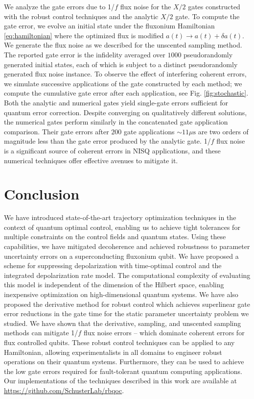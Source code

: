 \documentclass[
  amsfonts,
  amsmath,
  amssymb,
  pra,
  twocolumn,
  superscriptaddress,
]{revtex4-2}
\begin{document}
We analyze the gate errors due to 1/$f$ flux noise for
the $X/2$ gates constructed with the robust control techniques
and the analytic $X/2$ gate. To compute the gate error,
we evolve an initial state
under the fluxonium Hamiltonian \eqref{eq:hamiltonian}
where the optimized flux is modified $a(t) \rightarrow a(t) + \delta a(t)$.
We generate the flux noise as
we described for the unscented sampling method.
The reported gate error is the infidelity
averaged over $1000$ pseudorandomly generated initial states,
each of which is subject to a distinct pseudorandomly
generated flux noise instance.
To observe the effect of interfering coherent errors,
we simulate successive applications of the gate constructed by each method;
we compute the cumulative gate error
after each application, see Fig. \ref{fig:stochastic}.
Both the analytic
and numerical gates yield single-gate errors
sufficient for quantum error correction.
Despite converging on qualitatively different solutions, the
numerical gates perform similarly in the concatenated
gate application comparison. Their gate errors
after $200$ gate applications $\sim 11 \mu\textrm{s}$ are
two orders of magnitude less than the gate error produced by the analytic gate.
1/$f$ flux noise is a significant source of coherent errors in NISQ applications,
and these numerical techniques offer effective avenues to mitigate it.

\section{Conclusion}
We have introduced state-of-the-art trajectory optimization
techniques in the context of quantum optimal control, enabling
us to achieve tight tolerances for multiple constraints on the
control fields and quantum states. Using these capabilities,
we have mitigated decoherence and
achieved robustness to parameter uncertainty
errors on a superconducting fluxonium qubit.
We have proposed a scheme for suppressing
depolarization with time-optimal
control and the integrated depolarization rate model.
The computational complexity of evaluating this model is
independent of the dimension of the Hilbert space, enabling
inexpensive optimization on high-dimensional quantum systems.
We have also proposed the derivative method for robust control which achieves
superlinear gate error reductions in the gate time for the static parameter
uncertainty problem we studied.
We have shown that the derivative, sampling, and unscented sampling methods
can mitigate 1/$f$ flux noise errors -- which
dominate coherent errors for flux controlled qubits.
These robust control techniques can be applied
to any Hamiltonian,
allowing experimentalists in all domains to engineer robust
operations on their quantum systems.
Furthermore, they can be used to achieve the low gate errors
required for fault-tolerant quantum computing applications. Our
implementations of the techniques described in this work are available
at \url{https://github.com/SchusterLab/rbqoc}.
\end{document}
